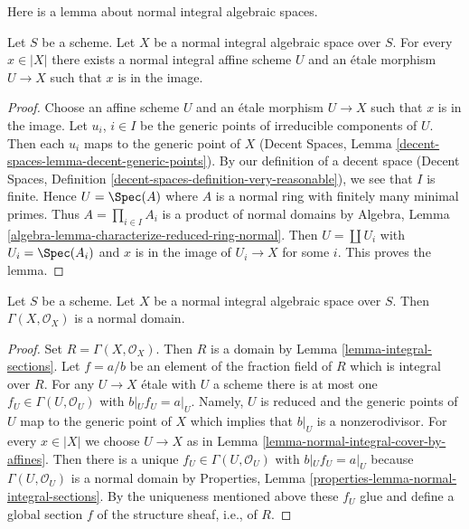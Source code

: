 \noindent
Here is a lemma about normal integral algebraic spaces.

\begin{lemma}
\label{lemma-normal-integral-cover-by-affines}
Let $S$ be a scheme. Let $X$ be a normal integral algebraic space over $S$.
For every $x \in |X|$ there exists a normal integral affine scheme $U$
and an \'etale morphism $U \to X$ such that $x$ is in the image.
\end{lemma}

\begin{proof}
Choose an affine scheme $U$ and an \'etale morphism $U \to X$ such that
$x$ is in the image. Let $u_i$, $i \in I$ be the generic points of irreducible
components of $U$. Then each $u_i$ maps to the generic point of $X$
(Decent Spaces, Lemma \ref{decent-spaces-lemma-decent-generic-points}). By 
our definition of a decent space
(Decent Spaces, Definition \ref{decent-spaces-definition-very-reasonable}),
we see that $I$ is finite. Hence $U = \Spec(A)$ where $A$ is a normal ring
with finitely many minimal primes.
Thus $A = \prod_{i \in I} A_i$ is a product of normal domains by
Algebra, Lemma \ref{algebra-lemma-characterize-reduced-ring-normal}.
Then $U = \coprod U_i$ with $U_i = \Spec(A_i)$ and $x$ is in the image of
$U_i \to X$ for some $i$. This proves the lemma.
\end{proof}

\begin{lemma}
\label{lemma-normal-integral-sections}
Let $S$ be a scheme. Let $X$ be a normal integral algebraic space over $S$.
Then $\Gamma(X, \mathcal{O}_X)$ is a normal domain.
\end{lemma}

\begin{proof}
Set $R = \Gamma(X, \mathcal{O}_X)$. Then $R$ is a domain by
Lemma \ref{lemma-integral-sections}.
Let $f = a/b$ be an element of the fraction field of $R$
which is integral over $R$.
For any $U \to X$ \'etale with $U$ a scheme there is at most one
$f_U \in \Gamma(U, \mathcal{O}_U)$ with $b|_U f_U = a|_U$.
Namely, $U$ is reduced and the generic points of $U$ map to
the generic point of $X$ which implies that $b|_U$ is a
nonzerodivisor.
For every $x \in |X|$ we choose $U \to X$ as in
Lemma \ref{lemma-normal-integral-cover-by-affines}.
Then there is a unique $f_U \in \Gamma(U, \mathcal{O}_U)$
with $b|_U f_U = a|_U$ because
$\Gamma(U, \mathcal{O}_U)$ is a normal domain by
Properties, Lemma \ref{properties-lemma-normal-integral-sections}.
By the uniqueness mentioned above these $f_U$
glue and define a global section $f$ of the structure
sheaf, i.e., of $R$.
\end{proof}






